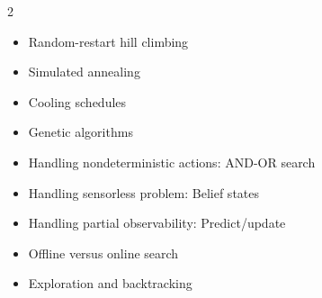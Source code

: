 \documentclass{report}
\begin{document}
\begin{multicols}{2}
\begin{itemize}[nosep,leftmargin=*]
    \item Random-restart hill climbing
    \item Simulated annealing
    \item Cooling schedules
    \item Genetic algorithms
    \item Handling nondeterministic actions: AND-OR search
    \item Handling sensorless problem: Belief states
    \item Handling partial observability: Predict/update
    \item Offline versus online search
    \item Exploration and backtracking
\end{itemize}
\end{multicols}
\end{document}
